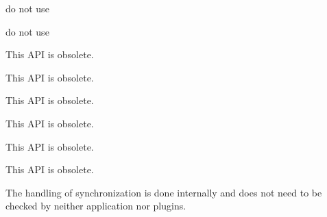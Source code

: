 \begin{DoxyRefList}
\item[\label{deprecated__deprecated000008}%
\Hypertarget{deprecated__deprecated000008}%
Member \hyperlink{group__key_gga91fb3178848bd682000958089abbaf40ab089c5e7977d6e58737eb586ee153b7f}{K\+E\+Y\+\_\+\+N\+U\+LL} ]do not use  
\item[\label{deprecated__deprecated000001}%
\Hypertarget{deprecated__deprecated000001}%
Member \hyperlink{group__key_gga91fb3178848bd682000958089abbaf40a28f01a87d65f065172f734c9c9446c0e}{K\+E\+Y\+\_\+\+U\+ID} ]do not use  
\item[\label{deprecated__deprecated000020}%
\Hypertarget{deprecated__deprecated000020}%
Member \hyperlink{group__meta_ga6b05da399c3c78904969ef39f191b0eb}{key\+Get\+A\+Time} (const \hyperlink{classkdb_1_1Key}{Key} $\ast$key)]This A\+PI is obsolete. 
\item[\label{deprecated__deprecated000024}%
\Hypertarget{deprecated__deprecated000024}%
Member \hyperlink{group__meta_ga2c213c120cbe02201278ef7fb8cd94be}{key\+Get\+C\+Time} (const \hyperlink{classkdb_1_1Key}{Key} $\ast$key)]This A\+PI is obsolete. 
\item[\label{deprecated__deprecated000015}%
\Hypertarget{deprecated__deprecated000015}%
Member \hyperlink{group__meta_ga46a95e81d7d7f4e3eb59e60e5f3738c0}{key\+Get\+G\+ID} (const \hyperlink{classkdb_1_1Key}{Key} $\ast$key)]This A\+PI is obsolete. 
\item[\label{deprecated__deprecated000018}%
\Hypertarget{deprecated__deprecated000018}%
Member \hyperlink{group__meta_gabc0cec592ce3b77e9bc33dbc8e8f6bdc}{key\+Get\+Mode} (const \hyperlink{classkdb_1_1Key}{Key} $\ast$key)]This A\+PI is obsolete. 
\item[\label{deprecated__deprecated000022}%
\Hypertarget{deprecated__deprecated000022}%
Member \hyperlink{group__meta_ga57689eb5691679071463b777ae786ae9}{key\+Get\+M\+Time} (const \hyperlink{classkdb_1_1Key}{Key} $\ast$key)]This A\+PI is obsolete. 
\item[\label{deprecated__deprecated000013}%
\Hypertarget{deprecated__deprecated000013}%
Member \hyperlink{group__meta_gacaa5060e67b03f50ae49a3620c54bc46}{key\+Get\+U\+ID} (const \hyperlink{classkdb_1_1Key}{Key} $\ast$key)]This A\+PI is obsolete. 
\item[\label{deprecated__deprecated000012}%
\Hypertarget{deprecated__deprecated000012}%
Member \hyperlink{group__keytest_gaf247df0de7aca04b32ef80e39ef12950}{key\+Need\+Sync} (const \hyperlink{classkdb_1_1Key}{Key} $\ast$key)]The handling of synchronization is done internally and does not need to be checked by neither application nor plugins. 

\end{DoxyRefList}
